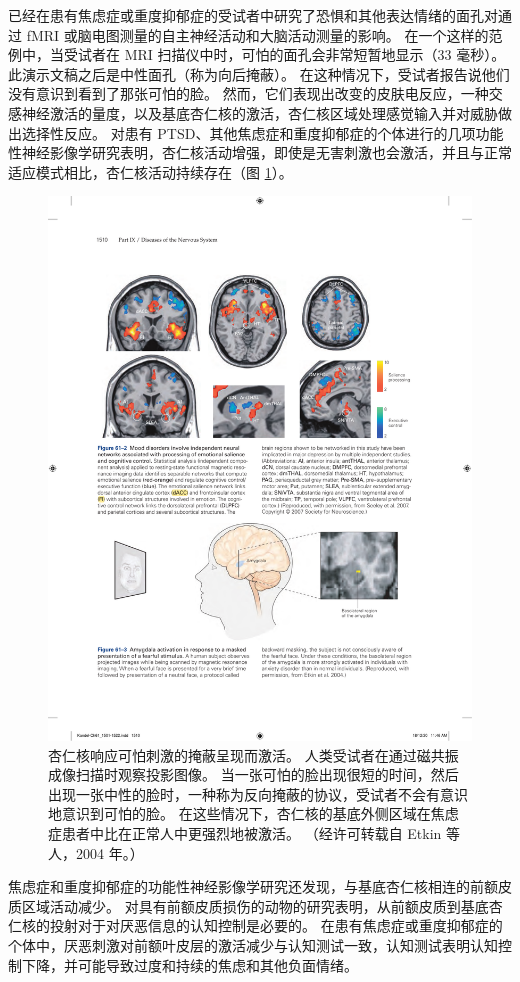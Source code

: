 已经在患有焦虑症或重度抑郁症的受试者中研究了恐惧和其他表达情绪的面孔对通过 fMRI 或脑电图测量的自主神经活动和大脑活动测量的影响。
在一个这样的范例中，当受试者在 MRI 扫描仪中时，可怕的面孔会非常短暂地显示（33 毫秒）。
此演示文稿之后是中性面孔（称为向后掩蔽）。
在这种情况下，受试者报告说他们没有意识到看到了那张可怕的脸。
然而，它们表现出改变的皮肤电反应，一种交感神经激活的量度，以及基底杏仁核的激活，杏仁核区域处理感觉输入并对威胁做出选择性反应。
对患有 PTSD、其他焦虑症和重度抑郁症的个体进行的几项功能性神经影像学研究表明，杏仁核活动增强，即使是无害刺激也会激活，并且与正常适应模式相比，杏仁核活动持续存在（图 \ref{fig:61_3}）。


\begin{figure}[htbp]
	\centering
	\includegraphics[width=0.8\linewidth]{chap61/fig_61_3}
	\caption{杏仁核响应可怕刺激的掩蔽呈现而激活。 人类受试者在通过磁共振成像扫描时观察投影图像。 当一张可怕的脸出现很短的时间，然后出现一张中性的脸时，一种称为反向掩蔽的协议，受试者不会有意识地意识到可怕的脸。 在这些情况下，杏仁核的基底外侧区域在焦虑症患者中比在正常人中更强烈地被激活。 （经许可转载自 Etkin 等人，2004 年。）}
	\label{fig:61_3}
\end{figure}


焦虑症和重度抑郁症的功能性神经影像学研究还发现，与基底杏仁核相连的前额皮质区域活动减少。
对具有前额皮质损伤的动物的研究表明，从前额皮质到基底杏仁核的投射对于对厌恶信息的认知控制是必要的。
在患有焦虑症或重度抑郁症的个体中，厌恶刺激对前额叶皮层的激活减少与认知测试一致，认知测试表明认知控制下降，并可能导致过度和持续的焦虑和其他负面情绪。



